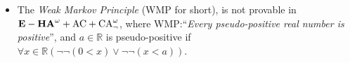 \documentclass[a4paper,12pt]{article}
\begin{document}
\begin{enumerate}
\begin{itemize}
\item The \emph{Weak Markov Principle}  (WMP for short), is not provable in ${\bf E-HA}^\omega + {\rm AC} + {\rm CA}_\lnot^\omega$, where WMP:``\emph{Every pseudo-positive real number is positive}'', and $a\in\mathbb{R}$ is pseudo-positive  if 
$\forall x\in \mathbb{R} (\lnot\lnot (0<x) \lor \lnot \lnot (x<a))$.

\end{itemize}

\end{enumerate}
\end{document}

